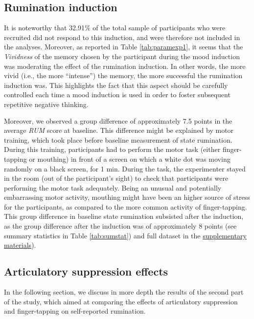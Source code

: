 \documentclass[a4paper,12pt,twoside,openright,oldfontcommands,final]{memoir}
\begin{document}
\hypertarget{rumination-induction-4}{%
\subsection{Rumination induction}\label{rumination-induction-4}}

It is noteworthy that 32.91\% of the total sample of participants who were recruited did not respond to this induction, and were therefore not included in the analyses. Moreover, as reported in Table \ref{tab:paramexp1}, it seems that the \emph{Vividness} of the memory chosen by the participant during the mood induction was moderating the effect of the rumination induction. In other words, the more vivid (i.e., the more \enquote{intense}) the memory, the more successful the rumination induction was. This highlights the fact that this aspect should be carefully controlled each time a mood induction is used in order to foster subsequent repetitive negative thinking.

Moreover, we observed a group difference of approximately 7.5 points in the average \emph{RUM} score at baseline. This difference might be explained by motor training, which took place before baseline measurement of state rumination. During this training, participants had to perform the motor task (either finger-tapping or mouthing) in front of a screen on which a white dot was moving randomly on a black screen, for 1 min. During the task, the experimenter stayed in the room (out of the participant's sight) to check that participants were performing the motor task adequately. Being an unusual and potentially embarrassing motor activity, mouthing might have been an higher source of stress for the participants, as compared to the more common activity of finger-tapping. This group difference in baseline state rumination subsisted after the induction, as the group difference after the induction was of approximately 8 points (see summary statistics in Table \ref{tab:sumstat}) and full dataset in the \protect\hyperlink{suppCh6}{supplementary materials}).

\hypertarget{articulatory-suppression-effects-1}{%
\subsection{Articulatory suppression effects}\label{articulatory-suppression-effects-1}}

In the following section, we discuss in more depth the results of the second part of the study, which aimed at comparing the effects of articulatory suppression and finger-tapping on self-reported rumination.
\end{document}
